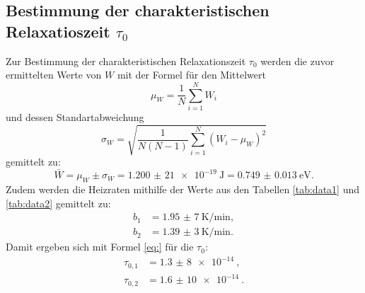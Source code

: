 \subsection{Bestimmung der charakteristischen Relaxatioszeit $\tau_0$}

Zur Bestimmung der charakteristischen Relaxationszeit $\tau_0$ werden die zuvor ermittelten Werte von $W$ mit der Formel für den Mittelwert
\[
\mu_W = \frac{1}{N}\sum_{i=1}^{N}W_i
\]
und dessen Standartabweichung
\[
\sigma_W = \sqrt{\frac{1}{N(N-1)}\sum_{i=1}^{N}(W_i-\mu_W)^2}
\]
gemittelt zu:
\[
\bar{W} = \mu_W \pm \sigma_W = \SI{1,200(21)e-19}{\joule} = \SI{0.749(13)}{\electronvolt}\text{.}
\]
Zudem werden die Heizraten mithilfe der Werte aus den Tabellen \ref{tab:data1} und \ref{tab:data2} gemittelt zu:
\begin{align*}
b_1 &= \SI{1,95(7)}{\kelvin\per\minute},\\
b_2 &= \SI{1,39(3)}{\kelvin\per\minute}\text{.} 
\end{align*}
Damit ergeben sich mit Formel \eqref{eq:} für die $\tau_0$:
\begin{align*}
\tau_{0,1} &= \SI{1,3(8)e-14}{},\\
\tau_{0,2} &= \SI{1,6(10)e-14}{}\text{.}
\end{align*}
